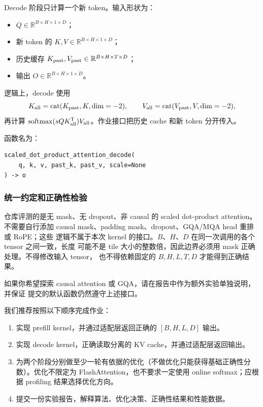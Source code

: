 \documentclass{article}
\begin{document}
Decode 阶段只计算一个新 token。输入形状为：
\begin{itemize}[leftmargin=2.5em]
  \item $Q\in\mathbb{R}^{B\times H\times 1\times D}$；
  \item 新 token 的 $K,V\in\mathbb{R}^{B\times H\times 1\times D}$；
  \item 历史缓存 $K_{\rm past},V_{\rm past}\in\mathbb{R}^{B\times H\times T\times D}$；
  \item 输出 $O\in\mathbb{R}^{B\times H\times 1\times D}$。
\end{itemize}

逻辑上，decode 使用
\begin{equation}
  K_{\rm all}=\operatorname{cat}(K_{\rm past},K,\text{dim}=-2),\qquad
  V_{\rm all}=\operatorname{cat}(V_{\rm past},V,\text{dim}=-2),
\end{equation}
再计算 $\operatorname{softmax}(sQK_{\rm all}^{\mathsf T})V_{\rm all}$。作业接口把历史 cache 和新 token 分开传入。

函数名为：
\begin{lstlisting}[style=interface]
scaled_dot_product_attention_decode(
    q, k, v, past_k, past_v, scale=None
) -> o
\end{lstlisting}


\subsubsection{统一约定和正确性检验}

仓库评测的是无 mask、无 dropout、非 causal 的 scaled dot-product attention。不需要自行添加 causal mask、padding mask、dropout、GQA/MQA head 重排或 RoPE；这些
逻辑不属于本次 kernel 的接口。$B$、$H$、$D$ 在同一次调用的各个 tensor 之间一致，长度
可能不是 tile 大小的整数倍，因此边界必须用 mask 正确处理。不得修改输入 tensor，
也不得依赖固定的 $B,H,L,T,D$ 才能得到正确结果。

如果你希望探索 causal attention 或 GQA，请在报告中作为额外实验单独说明，并保证
提交的默认函数仍然遵守上述接口。

我们推荐按照以下顺序完成作业：

\begin{enumerate}[leftmargin=2.5em]
  \item 实现 prefill kernel，并通过适配层返回正确的 $[B,H,L,D]$ 输出。
  \item 实现 decode kernel，正确读取分离的 KV cache，并通过适配层返回输出。
  \item 为两个阶段分别做至少一轮有依据的优化（不做优化只能获得基础正确性分数）。优化不限定为 FlashAttention，也不要求一定使用 online softmax；应根据 profiling 结果选择优化方向。
  \item 提交一份实验报告，解释算法、优化决策、正确性结果和性能数据。
\end{enumerate}
\end{document}
